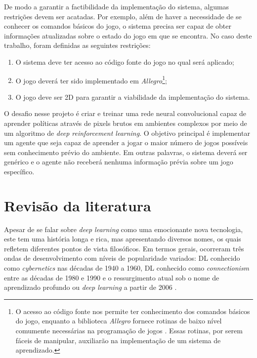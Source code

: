 De modo a garantir a factibilidade da implementação do sistema, algumas restrições devem ser acatadas. Por exemplo, além de haver a necessidade de se conhecer os comandos básicos do jogo, o sistema precisa ser capaz de obter informações atualizadas sobre o estado do jogo em que se encontra. No caso deste trabalho, foram definidas as seguintes restrições:

\begin{enumerate}
	\item O sistema deve ter acesso ao código fonte do jogo no qual será aplicado;
	\item O jogo deverá ter sido implementado em \textit{Allegro}\footnote{O acesso ao código fonte nos permite ter conhecimento dos comandos básicos do jogo, enquanto a biblioteca \textit{Allegro} fornece rotinas de baixo nível comumente necessárias na programação de jogos \cite{allegro}. Essas rotinas, por serem fáceis de manipular, auxiliarão na implementação de um sistema de aprendizado.};
	\item O jogo deve ser 2D para garantir a viabilidade da implementação do sistema.
\end{enumerate}

O desafio nesse projeto é criar e treinar uma rede neural convolucional capaz de aprender políticas através de pixels brutos em ambientes complexos por meio de um algoritmo de \textit{deep reinforcement learning}. O objetivo principal é implementar um agente que seja capaz de aprender a jogar o maior número de jogos possíveis sem conhecimento prévio do ambiente. Em outras palavras, o sistema deverá ser genérico e o agente não receberá nenhuma informação prévia sobre um jogo específico.

\section{Revisão da literatura}

Apesar de se falar sobre \textit{deep learning} como uma emocionante nova tecnologia, este tem uma história longa e rica, mas apresentando diversos nomes, os quais refletem diferentes pontos de vista filosóficos. Em termos gerais, ocorreram três ondas de desenvolvimento com níveis de popularidade variados: DL conhecido como \textit{cybernetics} nas décadas de 1940 a 1960, DL conhecido como \textit{connectionism} entre as décadas de 1980 e 1990 e o ressurgimento atual sob o nome de aprendizado profundo ou \textit{deep learning} a partir de 2006 \cite{Goodfellow-et-al-2016}.

